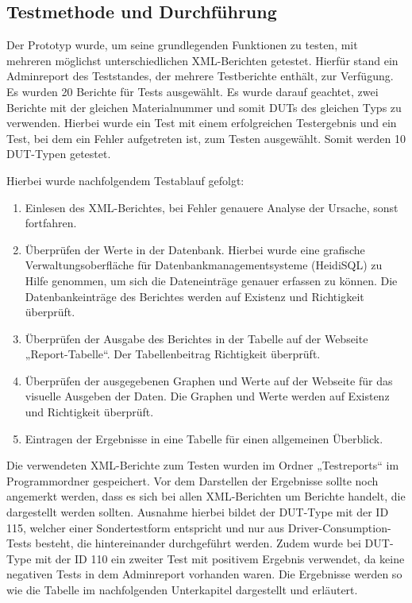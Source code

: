 \subsection{Testmethode und Durchführung}
\label{subsec:testmethoden-und-durchfuhrung}

Der Prototyp wurde, um seine grundlegenden Funktionen zu testen, mit mehreren möglichst unterschiedlichen XML-Berichten getestet.
Hierfür stand ein Adminreport des Teststandes, der mehrere Testberichte enthält, zur Verfügung.
Es wurden 20 Berichte für Tests ausgewählt.
Es wurde darauf geachtet, zwei Berichte mit der gleichen Materialnummer und somit \ac{DUTs} des gleichen Typs zu verwenden.
Hierbei wurde ein Test mit einem erfolgreichen Testergebnis und ein Test, bei dem ein Fehler aufgetreten ist, zum Testen ausgewählt.
Somit werden 10 DUT-Typen getestet.

Hierbei wurde nachfolgendem Testablauf gefolgt:

\begin{enumerate}

    \item Einlesen des XML-Berichtes, bei Fehler genauere Analyse der Ursache, sonst fortfahren.
    \item Überprüfen der Werte in der Datenbank. Hierbei wurde eine grafische Verwaltungsoberfläche für
    Datenbankmanagementsysteme (HeidiSQL) zu Hilfe genommen, um sich die Dateneinträge genauer erfassen zu können.
    Die Datenbankeinträge des Berichtes werden auf Existenz und Richtigkeit überprüft.
    \item Überprüfen der Ausgabe des Berichtes in der Tabelle auf der Webseite „Report-Tabelle“.
    Der Tabellenbeitrag Richtigkeit überprüft.
    \item Überprüfen der ausgegebenen Graphen und Werte auf der Webseite für das visuelle Ausgeben der Daten.
    Die Graphen und Werte werden auf Existenz und Richtigkeit überprüft.
    \item Eintragen der Ergebnisse in eine Tabelle für einen allgemeinen Überblick.

\end{enumerate}

Die verwendeten XML-Berichte zum Testen wurden im Ordner „Testreports“ im Programmordner gespeichert.
Vor dem Darstellen der Ergebnisse sollte noch angemerkt werden, dass es sich bei allen XML-Berichten um Berichte handelt, die dargestellt werden sollten.
Ausnahme hierbei bildet der DUT-Type mit der ID 115, welcher einer Sondertestform entspricht und nur aus Driver-Consumption-Tests besteht, die hintereinander durchgeführt werden.
Zudem wurde bei DUT-Type mit der ID 110 ein zweiter Test mit positivem Ergebnis verwendet, da keine negativen Tests in dem Adminreport vorhanden waren.
Die Ergebnisse werden so wie die Tabelle im nachfolgenden Unterkapitel dargestellt und erläutert.






